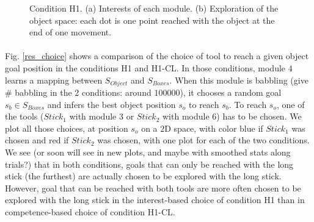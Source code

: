 \documentclass[10pt,letterpaper]{article}
\begin{document}
	\begin{figure}[ht]
		\caption{Condition H1. (a) Interests of each module. (b) Exploration of the object space: each dot is one point reached with the object at the end of one movement.}
		\label{res_interests}
	\end{figure}


	\paragraph{}
	Fig. \ref{res_choice} shows a comparison of the choice of tool to reach a given object goal position in the conditions H1 and H1-CL.
	In those conditions, module $4$ learns a mapping between $S_{Object}$ and $S_{Boxes}$. 
	When this module is babbling (give \# babbling in the 2 conditions: around $100000$), it chooses a random goal $s_b \in S_{Boxes}$ and infers the best object position $s_o$ to reach $s_b$.
	To reach $s_o$, one of the tools ($Stick_1$ with module $3$ or $Stick_2$ with module $6$) has to be chosen. 
	We plot all those choices, at position $s_o$ on a $2$D space, with color blue if $Stick_1$ was chosen and red if $Stick_2$ was chosen, with one plot for each of the two conditions.
	We see (or soon will see in new plots, and maybe with smoothed stats along trials?) that in both conditions, 
	goals that can only be reached with the long stick (the furthest) are actually chosen to be explored with the long stick.
	However, goal that can be reached with both tools are more often chosen to be explored with the long stick in the interest-based choice of condition H1 than in competence-based choice of condition H1-CL.
	
\end{document}
